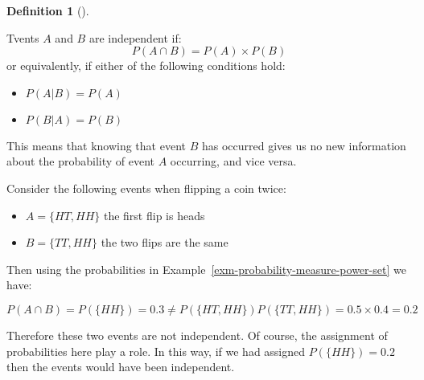 \documentclass[
  letterpaper,
]{scrbook}
\providecommand{\tightlist}{%
  \setlength{\itemsep}{0pt}\setlength{\parskip}{0pt}}
\theoremstyle{definition}
\newtheorem{definition}{Definition}[chapter]
\theoremstyle{plain}
\theoremstyle{plain}
\theoremstyle{definition}
\theoremstyle{remark}
\begin{document}
\begin{tcolorbox}[enhanced jigsaw, bottomtitle=1mm, coltitle=black, toprule=.15mm, toptitle=1mm, bottomrule=.15mm, colback=white, arc=.35mm, opacityback=0, breakable, title={Independent Events}, titlerule=0mm, rightrule=.15mm, colbacktitle=quarto-callout-note-color!10!white, colframe=quarto-callout-note-color-frame, opacitybacktitle=0.6, leftrule=.75mm, left=2mm]

\begin{definition}[]\protect\hypertarget{def-independent-events}{}\label{def-independent-events}

Tvents \(A\) and \(B\) are independent if:
\[ P(A \cap B) = P(A) \times P(B) \] or equivalently, if either of the
following conditions hold:

\begin{itemize}
\item
  \(P(A|B) = P(A)\)
\item
  \(P(B|A) = P(B)\)
\end{itemize}

\end{definition}

\end{tcolorbox}

This means that knowing that event \(B\) has occurred gives us no new
information about the probability of event \(A\) occurring, and vice
versa.

\begin{tcolorbox}[enhanced jigsaw, bottomtitle=1mm, coltitle=black, toprule=.15mm, toptitle=1mm, bottomrule=.15mm, colback=white, arc=.35mm, opacityback=0, breakable, title={Independent event when flipping a coin twice}, titlerule=0mm, rightrule=.15mm, colbacktitle=quarto-callout-note-color!10!white, colframe=quarto-callout-note-color-frame, opacitybacktitle=0.6, leftrule=.75mm, left=2mm]

Consider the following events when flipping a coin twice:

\begin{itemize}
\tightlist
\item
  \(A=\{HT, HH\}\) the first flip is heads
\item
  \(B=\{TT, HH\}\) the two flips are the same
\end{itemize}

Then using the probabilities in
Example~\ref{exm-probability-measure-power-set} we have:

\[
P(A\cap B) = P(\{HH\}) = 0.3 \neq P(\{HT,HH\})P(\{TT,HH\}) = 0.5\times 0.4  = 0.2
\]

Therefore these two events are not independent. Of course, the
assignment of probabilities here play a role. In this way, if we had
assigned \(P(\{HH\})=0.2\) then the events would have been independent.

\end{tcolorbox}
\end{document}
